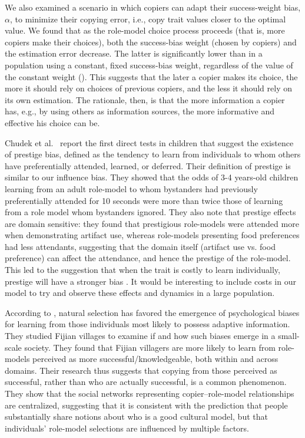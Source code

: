 \documentclass[12pt]{extarticle}
\begin{document}
We also examined a scenario in which copiers can adapt their success-weight bias, $\alpha$, to minimize their copying error, i.e., copy trait values closer to the optimal value.
We found that as the role-model choice process proceeds (that is, more copiers make their choices), both the success-bias weight ({chosen} by copiers) and the estimation error decrease. 
The latter is significantly lower {than in} a population using a constant, fixed success-bias weight, regardless of the value of the constant weight ().
This suggests that the later a copier makes its choice, the more it should rely on choices of previous copiers, and the less it should rely on its own estimation.
The rationale, then, is that the more information a copier has, e.g., by using others as information sources, the more informative and effective his choice can be.

{Chudek et al.}\ \citep{prestige_cultural_learning} report the first direct tests in children that suggest the existence of prestige bias, defined as the tendency to learn from individuals to whom others have preferentially attended, learned, or deferred.
Their definition of prestige is similar to our influence bias. They showed that the odds of 3-4 years-old children learning from an adult role-model to whom bystanders had previously preferentially attended for 10 seconds were more than twice those of {learning from a role model} whom bystanders ignored.
They also note that prestige effects are domain sensitive: they found that prestigious role-models were attended more when demonstrating artifact use, whereas role-models presenting food preferences had less attendants, suggesting that the domain itself (artifact use vs. food preference) can affect the attendance, and hence the prestige of the role-model.
This {led to the suggestion} that when the trait is costly to learn individually, prestige will have a stronger bias \citep{prestige_cultural_learning}.
It would be interesting to include costs in our model to try and observe these effects and dynamics in a large population.

According to \citep{fijian_social_bias}, {natural} selection has favored the emergence of psychological biases for learning from those individuals most likely to possess adaptive information. 
{They} studied Fijian villages to examine if and how such biases emerge in a small-scale society.
They found that Fijian villagers are more likely to learn from role-models perceived as more successful/knowledgeable, both within and across domains.
Their research thus suggests that copying from those perceived as successful, rather than {who are actually} successful, is a common {phenomenon}. 
They show that the social networks representing copier--role-model relationships are centralized, suggesting that it is consistent with the prediction that people substantially share notions about who is a good cultural model, but that individuals' role-model selections are influenced by multiple factors.
\end{document}
